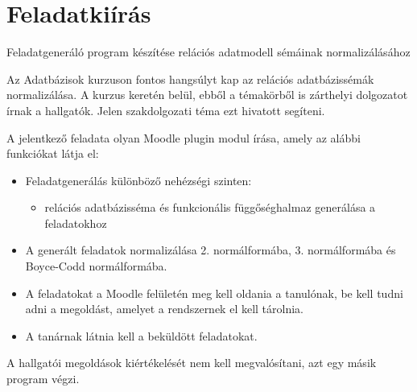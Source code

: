 \chapter*{Feladatkiírás}

Feladatgeneráló program készítése relációs adatmodell sémáinak normalizálásához

Az Adatbázisok kurzuson fontos hangsúlyt kap az relációs adatbázissémák normalizálása. A kurzus keretén belül, ebből a témakörből is zárthelyi dolgozatot írnak a hallgatók. Jelen szakdolgozati téma ezt hivatott segíteni.

A jelentkező feladata olyan Moodle plugin modul írása, amely az alábbi funkciókat látja el:
\begin{itemize}
    \item Feladatgenerálás különböző nehézségi szinten:
    \begin{itemize}
        \item relációs adatbázisséma és funkcionális függőséghalmaz generálása a feladatokhoz
    \end{itemize}
    \item A generált feladatok normalizálása 2. normálformába, 3. normálformába és Boyce-Codd normálformába.
    \item A feladatokat a Moodle felületén meg kell oldania a tanulónak, be kell tudni adni a megoldást, amelyet a rendszernek el kell tárolnia.
    \item A tanárnak látnia kell a beküldött feladatokat.
\end{itemize}
A hallgatói megoldások kiértékelését nem kell megvalósítani, azt egy másik program végzi.
